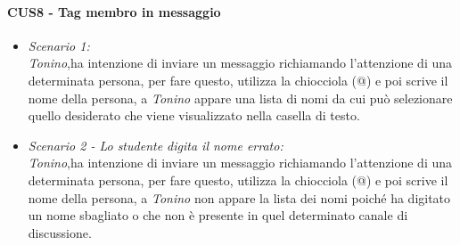 \paragraph{CUS8 - Tag membro in messaggio\\}
\begin{itemize}
\item \textit{Scenario 1:\\}
\textit{Tonino},ha intenzione di inviare un messaggio richiamando l’attenzione di una determinata persona, per fare questo, utilizza la chiocciola (@) e poi scrive il nome della persona, a \textit{Tonino} appare una lista di nomi da cui può selezionare quello desiderato che viene visualizzato nella casella di testo.\\

\item \textit{Scenario 2 - Lo studente digita il nome errato:\\}
\textit{Tonino},ha intenzione di inviare un messaggio richiamando l’attenzione di una determinata persona, per fare questo, utilizza la chiocciola (@) e poi scrive il nome della persona, a \textit{Tonino} non appare la lista dei nomi poiché ha digitato un nome sbagliato o che non è presente in quel determinato canale di discussione.\\

\end{itemize}


